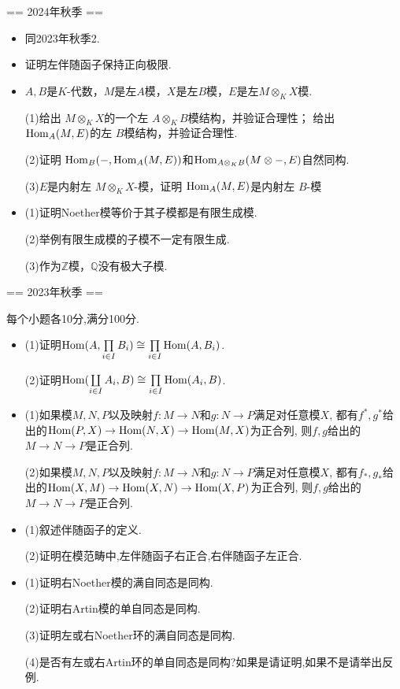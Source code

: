 == 2024年秋季 ==
\begin{itemize}
\item[1.]
同2023年秋季2.

\item[2.]
证明左伴随函子保持正向极限.

\item[3.]
$A,B$是$K$-代数，$M$是左$A$模，$X$是左$B$模，$E$是左$M\otimes_K X $模.

(1)给出 $M\otimes_K X$的一个左 $A\otimes_K B$模结构，并验证合理性；
给出 $\operatorname{Hom}_A(M,E)$的左 $B$模结构，并验证合理性.

(2)证明 $\operatorname{Hom}_B(-,\mathrm{Hom}_A(M, E))$和$\operatorname{Hom}_{A\otimes_K B}(M\otimes-, E)$自然同构.

(3)$E$是内射左 $M\otimes_KX$-模，证明 $\operatorname{Hom}_A(M,E)$是内射左 $B$-模

\item[4.]
(1)证明Noether模等价于其子模都是有限生成模.

(2)举例有限生成模的子模不一定有限生成.

(3)作为$\mathbb Z$模，$\mathbb Q$没有极大子模.
\end{itemize}


== 2023年秋季 ==

每个小题各10分,满分100分.

\begin{itemize}
\item[1.]
(1)证明$\operatorname{Hom}(A,\prod\limits_{i\in I} B_i)
\cong\prod\limits_{i\in I}\operatorname{Hom}(A, B_i)$.

(2)证明$\operatorname{Hom}(\coprod\limits_{i\in I} A_i,B)
\cong\prod\limits_{i\in I}\operatorname{Hom}(A_i, B)$.

\item[2.]
(1)如果模$M,N,P$以及映射$f:M\to N$和$g:N\to P$满足对任意模$X$,
都有$f^*,g^*$给出的$\operatorname{Hom}(P,X)\to\operatorname{Hom}(N,X)\to\operatorname{Hom}(M,X)$为正合列,
则$f,g$给出的$M\to N\to P$是正合列.

(2)如果模$M,N,P$以及映射$f:M\to N$和$g:N\to P$满足对任意模$X$,
都有$f_*,g_*$给出的$\operatorname{Hom}(X,M)\to\operatorname{Hom}(X,N)\to\operatorname{Hom}(X,P)$为正合列,
则$f,g$给出的$M\to N\to P$是正合列.

\item[3.]
(1)叙述伴随函子的定义.

(2)证明在模范畴中,左伴随函子右正合,右伴随函子左正合.

\item[4.]
(1)证明右Noether模的满自同态是同构.

(2)证明右Artin模的单自同态是同构.

(3)证明左或右Noether环的满自同态是同构.

(4)是否有左或右Artin环的单自同态是同构?如果是请证明,如果不是请举出反例.
\end{itemize}